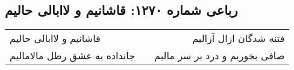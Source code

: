 \begin{center}
\section*{رباعی شماره ۱۲۷۰: قاشانیم و لاابالی حالیم}
\label{sec:1270}
\begin{longtable}{l p{0.5cm} r}
قاشانیم و لاابالی حالیم
&&
فتنه شدگان ازال آزالیم
\\
جانداده به عشق رطل مالامالیم
&&
صافی بخوریم و درد بر سر مالیم
\\
\end{longtable}
\end{center}
